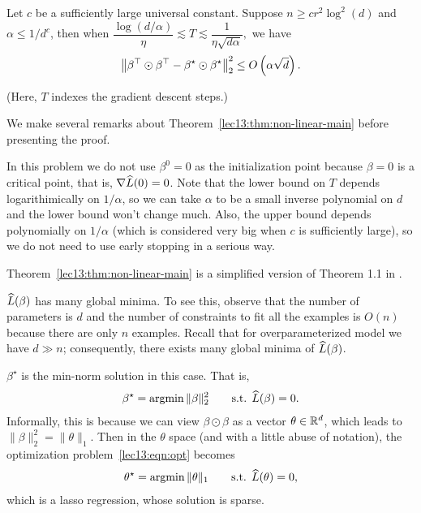 \begin{theorem}\label{lec13:thm:non-linear-main}
Let $c$ be a sufficiently large universal constant. Suppose $n\ge cr^2\log^2(d)$ and $\alpha\le 1 / d^c$, then when $\dfrac{\log(d/\alpha)}{\eta}\lesssim T\lesssim \dfrac{1}{\eta\sqrt{d\alpha}},$ we have
\begin{equation}\label{lec13:eqn:non-linear-main}
    \left\|\beta^\top\odot\beta^\top-\beta^\star\odot\beta^\star \right\|_2^2\le O \left( \alpha\sqrt{d} \right).
\end{equation}

(Here, $T$ indexes the gradient descent steps.)
\end{theorem}

We make several remarks about Theorem~\ref{lec13:thm:non-linear-main} before presenting the proof.

\begin{remark}
In this problem we do not use $\beta^0=0$ as the initialization point because $\beta=0$ is a critical point, that is, $\nabla\widehat{L}(0)=0$. Note that the lower bound on $T$ depends logarithimically on $1/\alpha$, so we can take $\alpha$ to be a small inverse polynomial on $d$ and the lower bound won't change much. Also, the upper bound depends polynomially on $1/\alpha$ (which is considered very big when $c$ is sufficiently large), so we do not need to use early stopping in a serious way.
\end{remark}

\begin{remark}
Theorem~\ref{lec13:thm:non-linear-main} is a simplified version of Theorem 1.1 in \cite{li2018algorithmic}.
\end{remark}

\begin{remark}
$\widehat{L}(\beta)$ has many global minima. To see this, observe that the number of parameters is $d$ and the number of constraints to fit all the examples is $O(n)$ because there are only $n$ examples. Recall that for overparameterized model we have $d\gg n$; consequently, there exists many global minima of $\widehat{L}(\beta)$.
\end{remark}

\begin{remark}
$\beta^\star$ is the min-norm solution in this case. That is,
    \begin{align}\label{lec13:eqn:opt}
        \beta^\star=\operatorname*{\textup{argmin}} \|\beta\|_2^2\qquad \text{s.t. }\widehat{L}(\beta)=0.
    \end{align}
    Informally, this is because we can view $\beta\odot \beta$ as a vector $\theta\in \mathbb R^{d}$, which leads to $\|\beta\|_2^2 =\|\theta\|_1.$ Then in the $\theta$ space (and with a little abuse of notation), the optimization problem~\eqref{lec13:eqn:opt} becomes
    \begin{align}\label{lec13:eqn:opt-theta}
        \theta^\star=\operatorname*{\textup{argmin}} \|\theta\|_1 \qquad \text{s.t. }\widehat{L}(\theta)=0,
    \end{align}
    which is a lasso regression, whose solution is sparse.
\end{remark}

